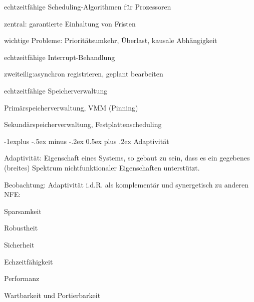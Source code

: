 \documentclass[a4paper]{article}
\makeatletter
\renewcommand{\subsection}{\@startsection{subsection}{2}{0mm}%
 {-1explus -.5ex minus -.2ex}%
 {0.5ex plus .2ex}%
 {\normalfont\normalsize\bfseries}}
\makeatother
\begin{document}
\begin{multicols}{3}
    \begin{enumerate*}
        \item
        echtzeitfähige Scheduling-Algorithmen für Prozessoren
        \begin{itemize*}
            \item zentral: garantierte Einhaltung von Fristen
            \item wichtige Probleme: Prioritätsumkehr, Überlast, kausale Abhängigkeit
        \end{itemize*}
        \item
        echtzeitfähige Interrupt-Behandlung
        \begin{itemize*}
            \item zweiteilig:asynchron registrieren, geplant bearbeiten
        \end{itemize*}
        \item
        echtzeitfähige Speicherverwaltung
        \begin{itemize*}
            \item Primärspeicherverwaltung, VMM (Pinning)
            \item Sekundärspeicherverwaltung, Festplattenscheduling
        \end{itemize*}
    \end{enumerate*}


    \subsection{Adaptivität}

    \begin{itemize*}
        \item
        Adaptivität: Eigenschaft eines Systems, so gebaut zu sein, dass es ein
        gegebenes (breites) Spektrum nichtfunktionaler Eigenschaften
        unterstützt.
        \item
        Beobachtung: Adaptivität i.d.R. als komplementär und synergetisch zu
        anderen NFE:
        \begin{itemize*}
            \item Sparsamkeit
            \item Robustheit
            \item Sicherheit
            \item Echzeitfähigkeit
            \item Performanz
            \item Wartbarkeit und Portierbarkeit
        \end{itemize*}
    \end{itemize*}


\end{multicols}
\end{document}

